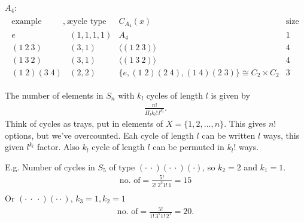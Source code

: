 \emph{$A_4$}:
\begin{align*}
    \begin{array}{cccc}
        \text{example member}, x & \text{cycle type} & C_{A_4}(x) & \text{size of ccl} \\
        e & (1, 1, 1, 1) & A_4 & 1 \\
        (1\ 2\ 3) & (3, 1) & \langle (1\ 2\ 3) \rangle & 4\\
        (1\ 3\ 2) & (3, 1) & \langle (1\ 3\ 2) \rangle & 4 \\
        (1\; 2)(3\; 4) & (2, 2) & \{e, (1\; 2)(2\; 4), (1\; 4)(2\; 3) \} \cong C_2 \times C_2 & 3
    \end{array}  
\end{align*} 

\begin{remark}
    The number of elements in $S_n$ with $k_l$ cycles of length $l$ is given by 
    \begin{align*}
        \frac{n!}{\Pi_l k_l! \, l^{k_l}}.
    \end{align*} 
    Think of cycles as trays, put in elements of $X = \{1, 2, \ldots, n\}$.
    This gives $n!$ options, but we've overcounted.
    Eah cycle of length $l$ can be written $l$ ways, this given $l^{k_l}$ factor.
    Also $k_l$ cycle of length $l$ can be permuted in $k_l !$ ways.
\end{remark} 

\begin{example}
    E.g. Number of cycles in $S_5$ of type $(\cdot \ \cdot) (\cdot \ \cdot) (\cdot)$, so $k_2 = 2$ and $k_1 = 1$.
    \begin{align*}
        \text{no. of} = \frac{5!}{2! \, 2^2 1! \, 1} = 15 \\ 
    \end{align*} 
    Or $(\cdot \ \cdot \ \cdot) (\cdot \cdot)$, $k_3 = 1, k_2 = 1$
    \begin{align*}
        \text{no. of} = \frac{5!}{1! \, 3^1 1! \, 2^1} = 20.
    \end{align*} 
\end{example} 

